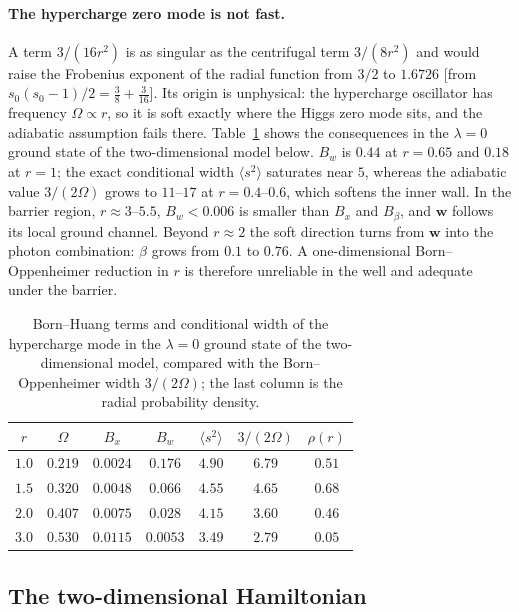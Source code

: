 \paragraph{The hypercharge zero mode is not fast.}
A term $3/(16r^2)$ is as singular as the centrifugal term $3/(8r^2)$ and would raise the Frobenius exponent of the radial function from $3/2$ to $1.6726$ [from $s_0(s_0-1)/2=\frac38+\frac3{16}$]. %
Its origin is unphysical: the hypercharge oscillator has frequency $\Omega\propto r$, so it is soft exactly where the Higgs zero mode sits, and the adiabatic assumption fails there.
Table~\ref{tab:rb-BH} shows the consequences in the $\lambda=0$ ground state of the two-dimensional model below.
$B_w$ is $0.44$ at $r=0.65$ and $0.18$ at $r=1$; the exact conditional width $\langle s^2\rangle$ saturates near $5$, whereas the adiabatic value $3/(2\Omega)$ grows to $11$--$17$ at $r=0.4$--$0.6$, which softens the inner wall. %
In the barrier region, $r\approx3$--$5.5$, $B_w<0.006$ is smaller than $B_x$ and $B_\beta$, and $\bm w$ follows its local ground channel. %
Beyond $r\approx2$ the soft direction turns from $\bm w$ into the photon combination: $\beta$ grows from $0.1$ to $0.76$. %
A one-dimensional Born--Oppenheimer reduction in $r$ is therefore unreliable in the well and adequate under the barrier.

\begin{table}[t]
\centering
\caption{Born--Huang terms and conditional width of the hypercharge mode in the $\lambda=0$ ground state of the two-dimensional model, compared with the Born--Oppenheimer width $3/(2\Omega)$; the last column is the radial probability density.} %
\label{tab:rb-BH}
\begin{tabular}{ccccccc}
\toprule
$r$ & $\Omega$ & $B_x$ & $B_w$ & $\langle s^2\rangle$ & $3/(2\Omega)$ & $\rho(r)$ \\
\midrule
$1.0$ & $0.219$ & $0.0024$ & $0.176$ & $4.90$ & $6.79$ & $0.51$ \\ %
$1.5$ & $0.320$ & $0.0048$ & $0.066$ & $4.55$ & $4.65$ & $0.68$ \\ %
$2.0$ & $0.407$ & $0.0075$ & $0.028$ & $4.15$ & $3.60$ & $0.46$ \\ %
$3.0$ & $0.530$ & $0.0115$ & $0.0053$ & $3.49$ & $2.79$ & $0.05$ \\ %
\bottomrule
\end{tabular}
\end{table}

\subsection{The two-dimensional Hamiltonian}
\label{sec:rb-2d}

